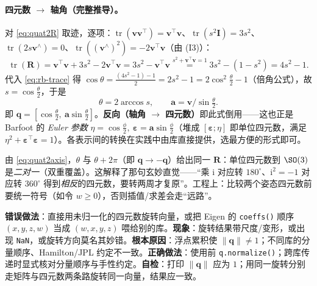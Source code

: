 \paragraph{四元数 $\to$ 轴角（完整推导）。}对 \cref{eq:quat2R} 取迹，逐项：$\operatorname{tr}(\mathbf{v}\mathbf{v}^\top)=\mathbf{v}^\top\mathbf{v}$、$\operatorname{tr}(s^2\mathbf{I})=3s^2$、$\operatorname{tr}(2s\mathbf{v}^\wedge)=0$、$\operatorname{tr}((\mathbf{v}^\wedge)^2)=-2\mathbf{v}^\top\mathbf{v}$（由 (I3)）：
\begin{equation}
  \operatorname{tr}(\mathbf{R})=\mathbf{v}^\top\mathbf{v}+3s^2-2\mathbf{v}^\top\mathbf{v}=3s^2-\mathbf{v}^\top\mathbf{v}\overset{s^2+\mathbf{v}^\top\mathbf{v}=1}{=}3s^2-(1-s^2)=4s^2-1.
\end{equation}
代入 \cref{eq:rb-trace} 得 $\cos\theta=\frac{(4s^2-1)-1}{2}=2s^2-1=2\cos^2\tfrac{\theta}{2}-1$（倍角公式），故 $s=\cos\tfrac{\theta}{2}$，于是
\begin{equation}
  \theta=2\arccos s,\qquad \mathbf{a}=\mathbf{v}\big/\sin\tfrac{\theta}{2}.
  \label{eq:quat2axis}
\end{equation}
即 $\mathbf{q}=[\cos\tfrac{\theta}{2},\ \mathbf{a}\sin\tfrac{\theta}{2}]$。\textbf{反向（轴角 $\to$ 四元数）}即此式倒用——这也正是 Barfoot 的 \emph{Euler 参数} $\eta=\cos\tfrac{\phi}{2},\ \boldsymbol{\varepsilon}=\mathbf{a}\sin\tfrac{\phi}{2}$（堆成 $[\boldsymbol{\varepsilon};\eta]$ 即单位四元数，满足 $\eta^2+\boldsymbol{\varepsilon}^\top\boldsymbol{\varepsilon}=1$）\cite{barfoot2024state}。各表示间的转换在实践中由库直接提供，选最方便的形式即可。

\begin{insight}
由 \cref{eq:quat2axis}，$\theta$ 与 $\theta+2\pi$（即 $\mathbf{q}\to-\mathbf{q}$）给出同一 $\mathbf{R}$：单位四元数到 $\SO(3)$ 是\emph{二对一}（双重覆盖）。这解释了那句玄妙直觉——“乘 $\mathrm{i}$ 对应转 $180^\circ$、$\mathrm{i}^2=-1$ 对应转 $360^\circ$ 得到\emph{相反}的四元数，要转两周才复原”\cite{gaoxiang2019slam14}。工程上：比较两个姿态四元数前要统一符号（如令 $w\ge0$），否则插值/求差会走“远路”。
\end{insight}

\begin{pitfall}
\textbf{错误做法}：直接用未归一化的四元数旋转向量，或把 Eigen 的 \texttt{coeffs()} 顺序 $(x,y,z,w)$ 当成 $(w,x,y,z)$ 喂给别的库。\textbf{现象}：旋转结果带尺度/变形，或出现 \texttt{NaN}，或旋转方向莫名其妙错。\textbf{根本原因}：浮点累积使 $\|\mathbf{q}\|\neq1$；不同库的分量顺序、Hamilton/JPL 约定不一致。\textbf{正确做法}：使用前 \texttt{q.normalize()}；跨库传递时显式核对分量顺序与手性约定。\textbf{自检}：打印 $\|\mathbf{q}\|$ 应为 $1$；用同一旋转分别走矩阵与四元数两条路旋转同一向量，结果应一致。
\end{pitfall}


